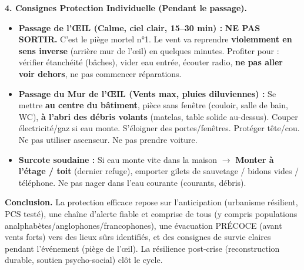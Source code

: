 \documentclass[11pt]{article}
\begin{document}
\begin{exoresolu}
\textbf{4. Consignes Protection Individuelle (Pendant le passage).}
\begin{itemize}
    \item \textbf{Passage de l'ŒIL (Calme, ciel clair, 15--30 min) :} \textbf{NE PAS SORTIR.} C'est le piège mortel n°1. Le vent va reprendre \textbf{violemment en sens inverse} (arrière mur de l'œil) en quelques minutes. Profiter pour : vérifier étanchéité (bâches), vider eau entrée, écouter radio, \textbf{ne pas aller voir dehors}, ne pas commencer réparations.
    \item \textbf{Passage du Mur de l'ŒIL (Vents max, pluies diluviennes) :} Se mettre \textbf{au centre du bâtiment}, pièce sans fenêtre (couloir, salle de bain, WC), \textbf{à l'abri des débris volants} (matelas, table solide au-dessus). Couper électricité/gaz si eau monte. S'éloigner des portes/fenêtres. Protéger tête/cou. Ne pas utiliser ascenseur. Ne pas prendre voiture.
    \item \textbf{Surcote soudaine :} Si eau monte vite dans la maison $\to$ \textbf{Monter à l'étage / toit} (dernier refuge), emporter gilets de sauvetage / bidons vides / téléphone. Ne pas nager dans l'eau courante (courants, débris).
\end{itemize}

\textbf{Conclusion.} La protection efficace repose sur l'anticipation (urbanisme résilient, PCS testé), une chaîne d'alerte fiable et comprise de tous (y compris populations analphabètes/anglophones/francophones), une évacuation PRÉCOCE (avant vents forts) vers des lieux sûrs identifiés, et des consignes de survie claires pendant l'événement (piège de l'œil). La résilience post-crise (reconstruction durable, soutien psycho-social) clôt le cycle.
\end{exoresolu}

\end{document}
